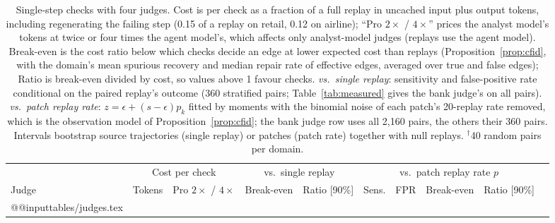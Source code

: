 \documentclass[11pt]{article}
\begin{document}
\begin{table}[t]
\centering
\small
\setlength{\tabcolsep}{4pt}
\begin{tabular}{lccccccccc}
\toprule
 & \multicolumn{2}{c}{Cost per check} & \multicolumn{2}{c}{vs.\ single replay} & \multicolumn{4}{c}{vs.\ patch replay rate $p$} \\
\cmidrule(lr){2-3}\cmidrule(lr){4-5}\cmidrule(lr){6-9}
Judge & Tokens & Pro $2\times$ / $4\times$ & Break-even & Ratio [90\%] & Sens. & FPR & Break-even & Ratio [90\%] \\
\midrule
\csname @@input\endcsname tables/judges.tex
\bottomrule
\end{tabular}
\caption{Single-step checks with four judges. Cost is per check as a fraction of a full replay in uncached input plus output tokens, including regenerating the failing step (0.15 of a replay on retail, 0.12 on airline); ``Pro $2\times$ / $4\times$'' prices the analyst model's tokens at twice or four times the agent model's, which affects only analyst-model judges (replays use the agent model). Break-even is the cost ratio below which checks decide an edge at lower expected cost than replays (Proposition~\ref{prop:cfid}, with the domain's mean spurious recovery and median repair rate of effective edges, averaged over true and false edges); Ratio is break-even divided by cost, so values above 1 favour checks. \emph{vs.\ single replay}: sensitivity and false-positive rate conditional on the paired replay's outcome (360 stratified pairs; Table~\ref{tab:measured} gives the bank judge's on all pairs). \emph{vs.\ patch replay rate}: $z=\epsilon+(s-\epsilon)p_k$ fitted by moments with the binomial noise of each patch's 20-replay rate removed, which is the observation model of Proposition~\ref{prop:cfid}; the bank judge row uses all 2{,}160 pairs, the others their 360 pairs. Intervals bootstrap source trajectories (single replay) or patches (patch rate) together with null replays. $^\dagger$40 random pairs per domain.}
\label{tab:judges}
\end{table}
\end{document}
